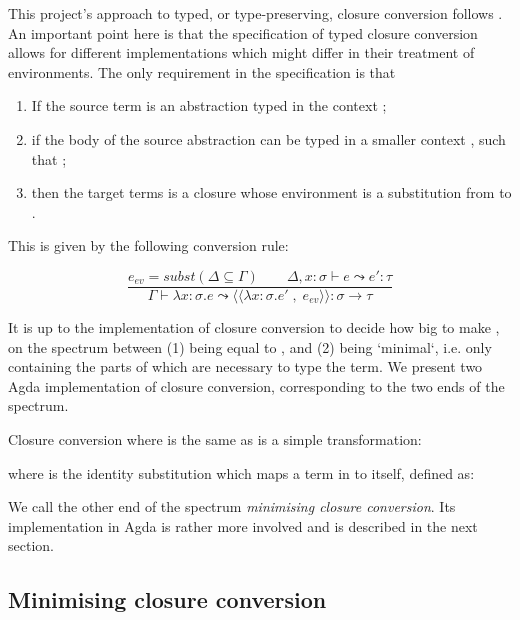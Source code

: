 \documentclass[bsc,frontabs,oneside,singlespacing,parskip,deptreport]{infthesis}
\theoremstyle{definition}
\begin{document}
This project's approach to typed, or type-preserving, closure
conversion follows \cite{DBLP:conf/popl/MinamideMH96}. An important
point here is that the specification of typed closure conversion
allows for different implementations which might differ in their
treatment of environments. The only requirement in the specification
is that

\begin{enumerate}
\item If the source term is an abstraction typed in the context
  ;
\item if the body of the source abstraction can be typed in a smaller
  context , such that ;
\item then the target terms is a closure whose environment is a
  substitution from  to .
\end{enumerate}

This is given by the following conversion rule:

\[
  \frac
  {e_{ev} = subst (\Delta \subseteq \Gamma) \quad \quad \Delta , x : \sigma \vdash e \leadsto e' : \tau }
  {\Gamma \vdash \lambda x : \sigma . e \leadsto
    \langle\langle \lambda x : \sigma . e' \; , \; e_{ev} \rangle\rangle : \sigma \rightarrow \tau}
\]

It is up to the implementation of closure conversion to decide how big
to make , on the spectrum between (1)  being equal to
, and (2)  being `minimal`, i.e. only containing the parts
of  which are necessary to type the term. We present two Agda
implementation of closure conversion, corresponding to the two ends of
the spectrum.

Closure conversion where  is the same as  is a simple
transformation:


where  is the identity substitution which maps a term
in  to itself, defined as:


We call the other end of the spectrum \textit{minimising closure
  conversion}. Its implementation in Agda is rather more involved and
is described in the next section.

\subsection{Minimising closure conversion}
\label{sec:minim-clos-conv}
\end{document}
